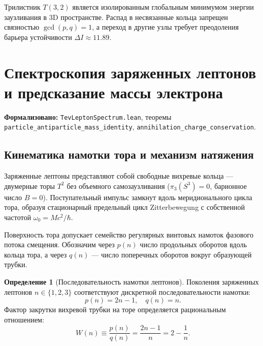 \documentclass[11pt,a4paper]{article}
\theoremstyle{definition}
\newtheorem{definition}{Определение}
\theoremstyle{remark}
\begin{document}
Трилистник $T(3,2)$ является изолированным глобальным минимумом энергии заузливания в 3D пространстве. Распад в несвязанные кольца запрещен связностью $\gcd(p,q)=1$, а переход в другие узлы требует преодоления барьера устойчивости $\Delta I \approx 11.89$.
	
\section{Спектроскопия заряженных лептонов и предсказание массы электрона}
\noindent\small\textbf{Формализовано:} \texttt{TevLeptonSpectrum.lean}, теоремы \texttt{particle\_antiparticle\_mass\_identity}, \texttt{annihilation\_charge\_conservation}.
	
\subsection{Кинематика намотки тора и механизм натяжения}
	
Заряженные лептоны представляют собой свободные вихревые кольца — двумерные торы $T^2$ без объемного самозаузливания ($\pi_3(S^3) = 0$, барионное число $B = 0$). Поступательный импульс замкнут вдоль меридионального цикла тора, образуя стационарный предельный цикл Zitterbewegung с собственной частотой $\omega_0 = M c^2 / \hbar$.

Поверхность тора допускает семейство регулярных винтовых намоток фазового потока смещения. Обозначим через $p(n)$ число продольных оборотов вдоль кольца тора, а через $q(n)$ — число поперечных оборотов вокруг образующей трубки.
	
\begin{definition}[Последовательность намотки лептонов]
Поколения заряженных лептонов $n \in \{1, 2, 3\}$ соответствуют дискретной последовательности намотки:
\begin{equation}
	p(n) = 2n - 1, \quad q(n) = n.
	\label{eq:lepton_winding_components}
\end{equation}
Фактор закрутки вихревой трубки на торе определяется рациональным отношением:
\begin{equation}
	W(n) \equiv \frac{p(n)}{q(n)} = \frac{2n - 1}{n} = 2 - \frac{1}{n}.
	\label{eq:spring_winding}
\end{equation}
\end{definition}
	
\end{document}
